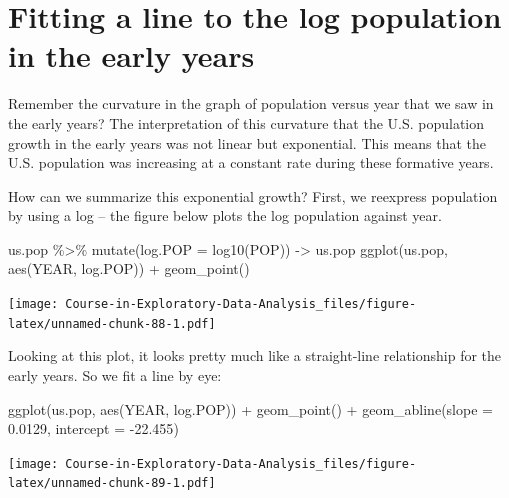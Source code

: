 \documentclass[
]{book}
\newenvironment{Shaded}{\begin{snugshade}}{\end{snugshade}}
\newcommand{\AttributeTok}[1]{\textcolor[rgb]{0.77,0.63,0.00}{#1}}
\newcommand{\FloatTok}[1]{\textcolor[rgb]{0.00,0.00,0.81}{#1}}
\newcommand{\FunctionTok}[1]{\textcolor[rgb]{0.00,0.00,0.00}{#1}}
\newcommand{\NormalTok}[1]{#1}
\newcommand{\OtherTok}[1]{\textcolor[rgb]{0.56,0.35,0.01}{#1}}
\newcommand{\SpecialCharTok}[1]{\textcolor[rgb]{0.00,0.00,0.00}{#1}}
\begin{document}
\hypertarget{fitting-a-line-to-the-log-population-in-the-early-years}{%
\section{Fitting a line to the log population in the early years}\label{fitting-a-line-to-the-log-population-in-the-early-years}}

Remember the curvature in the graph of population versus year that we saw in the early years? The interpretation of this curvature that the U.S. population growth in the early years was not linear but exponential. This means that the U.S. population was increasing at a constant rate during these formative years.

How can we summarize this exponential growth? First, we reexpress population by using a log -- the figure below plots the log population against year.

\begin{Shaded}
\begin{Highlighting}[]
\NormalTok{us.pop }\SpecialCharTok{\%\textgreater{}\%} \FunctionTok{mutate}\NormalTok{(}\AttributeTok{log.POP =} \FunctionTok{log10}\NormalTok{(POP)) }\OtherTok{{-}\textgreater{}}\NormalTok{ us.pop}
\FunctionTok{ggplot}\NormalTok{(us.pop, }\FunctionTok{aes}\NormalTok{(YEAR, log.POP)) }\SpecialCharTok{+}
  \FunctionTok{geom\_point}\NormalTok{()}
\end{Highlighting}
\end{Shaded}

\texttt{[image: Course-in-Exploratory-Data-Analysis\_files/figure-latex/unnamed-chunk-88-1.pdf]}

Looking at this plot, it looks pretty much like a straight-line relationship for the early years. So we fit a line by eye:

\begin{Shaded}
\begin{Highlighting}[]
\FunctionTok{ggplot}\NormalTok{(us.pop, }\FunctionTok{aes}\NormalTok{(YEAR, log.POP)) }\SpecialCharTok{+}
  \FunctionTok{geom\_point}\NormalTok{() }\SpecialCharTok{+}
  \FunctionTok{geom\_abline}\NormalTok{(}\AttributeTok{slope =} \FloatTok{0.0129}\NormalTok{, }\AttributeTok{intercept =} \SpecialCharTok{{-}}\FloatTok{22.455}\NormalTok{)}
\end{Highlighting}
\end{Shaded}

\texttt{[image: Course-in-Exploratory-Data-Analysis\_files/figure-latex/unnamed-chunk-89-1.pdf]}
\end{document}
